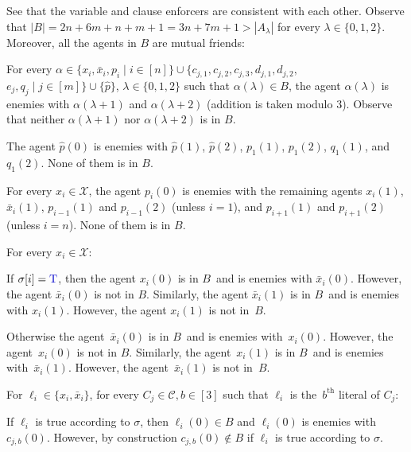 \documentclass[a4paper,fleqn]{cas-sc}
\newcommand{\coalA}{\ensuremath{A}}
\newcommand{\coalB}{\ensuremath{B}}
\newcommand{\ri}{\ensuremath{{\lambda}}}
\newcommand{\tvarN}[1]{\ensuremath{x_{#1}}}
\newcommand{\fvarN}[1]{\ensuremath{\bar{x}_{#1}}}
\newcommand{\cladN}[2]{\ensuremath{c_{#1,#2}}}
\newcommand{\claeN}[2]{\ensuremath{d_{#1,#2}}}\newcommand{\clafN}[1]{\ensuremath{e_{#1}}}
\newcommand{\pickN}[1]{\ensuremath{p_{#1}}}
\newcommand{\qickN}[1]{\ensuremath{q_{#1}}}
\newcommand{\mainpickN}{\ensuremath{\hat{p}}}
\newcommand{\tvar}[2]{\ensuremath{\tvarN{#1}(#2)}}
\newcommand{\fvar}[2]{\ensuremath{\fvarN{#1}(#2)}}
\newcommand{\clad}[3]{\ensuremath{\cladN{#1}{#2}(#3)}}
\newcommand{\pick}[2]{\ensuremath{\pickN{#1}(#2)}}
\newcommand{\qick}[2]{\ensuremath{\qickN{#1}(#2)}}
\newcommand{\mainpick}[1]{\ensuremath{\mainpickN(#1)}}
\newcommand{\ii}{\ensuremath{{i}}}
\newcommand{\cia}{\ensuremath{{j}}}
\newcommand{\clausecount}{{\ensuremath{b}}}
\newcommand{\agentholder}{\ensuremath{\alpha}}
\newcommand{\varT}{\text{\color{blue!80!black}T}}
\newcommand{\asg}{\ensuremath{\sigma}}
\newcommand{\vars}{\mathcal{X}}
\newcommand{\clas}{\mathcal{C}}
\begin{document}
{See that the variable and clause enforcers are consistent with each other.
Observe that $|\coalB| = 2n + 6m + n + m + 1 = 3n + 7m + 1 > |\coalA_\ri|$ for every $\ri \in \{0,1,2\}$. 
Moreover, all the agents in $\coalB$ are mutual friends:
\begin{compactitem}
\item For every $\agentholder \in \{\tvarN i, \fvarN i, \pickN i \mid i \in [n]\} \cup \{\cladN \cia 1, \cladN \cia 2, \cladN \cia 3, \claeN \cia 1, \claeN \cia 2,$ $\clafN \cia, \qickN \cia \mid \cia \in [m]\} \cup \{\mainpickN\}$, $\ri \in \{0,1,2\}$ such that $\agentholder(\ri) \in \coalB$, the agent $\agentholder(\ri)$ is enemies with $\agentholder(\ri + 1)$ and $\agentholder(\ri + 2)$ (addition is taken modulo 3). Observe that neither $\agentholder(\ri + 1)$ nor $\agentholder(\ri + 2)$ is in \coalB.
\item The agent \mainpick 0 is enemies with \mainpick 1, \mainpick 2, \pick 1 1, \pick 1 2, \qick 1 1, and \qick 1 2. None of them is in \coalB.
\item For every $x_\ii \in \vars$, the agent \pick \ii 0 is enemies with the remaining agents \tvar \ii 1, \fvar \ii 1, \pick {\ii - 1} 1 and \pick {\ii - 1} 2 (unless $\ii = 1$), and \pick {\ii + 1} 1 and \pick {\ii + 1} 2 (unless $\ii = n$). None of them is in \coalB. 
\item For every $x_\ii \in \vars$:
\begin{compactitem}
\item If $\asg[\ii] = \varT$, then
the agent \tvar \ii 0 is in \coalB\ and is enemies with \fvar \ii 0. However, the agent $\fvar \ii 0$ is not in $\coalB$.
Similarly, the agent \fvar \ii 1 is in \coalB\ and is enemies with \tvar \ii 1. However, the agent $\tvar \ii 1$ is not in~$\coalB$.
\item Otherwise the agent~\fvar \ii 0 is in \coalB\ and is enemies with~\tvar \ii 0. However, the agent~$\tvar \ii 0$ is not in $\coalB$.
Similarly, the agent~\tvar \ii 1 is in \coalB\ and is enemies with~\fvar \ii 1. However, the agent~$\fvar \ii 1$ is not in~$\coalB$.
\end{compactitem}
For $\ell_\ii \in \{x_\ii, \bar{x}_\ii\}$, for every $C_\cia \in \clas, \clausecount \in [3]$ such that $\ell_\ii$ is the~$\clausecount^{\text{th}}$ literal of $C_\cia$:
\begin{compactitem}
\item If $\ell_\ii$ is true according to \asg, then $\ell_\ii(0) \in \coalB$ and $\ell_\ii(0)$ is enemies with $\clad \cia \clausecount 0$. However, by construction $\clad \cia \clausecount 0 \notin \coalB$ if $\ell_\ii$ is true according to \asg.

\end{compactitem}
\end{compactitem}}
\end{document}
